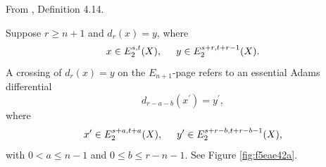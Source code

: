 \begin{definition}
\label{paper:4.14}
From \cite{LWX126}, Definition 4.14.\par
\label{def:classicalcrossdiff}
    Suppose $r\ge n+1$ and $d_r(x)=y$, where
    $$x\in E_2^{s,t}(X), \hspace{0.5cm} y\in E_2^{s+r,t+r-1}(X).$$
    A crossing of $d_r(x)=y$ on the $E_{n+1}$-page refers to an essential Adams differential
    $$d_{r-a-b}(x^\prime)=y^\prime,$$
    where
    $$x^\prime\in E_2^{s+a,t+a}(X), \hspace{.5cm} y^\prime\in E_2^{s+r-b,t+r-b-1}(X),$$
    with $0<a\le n-1$ and $0\le b\le r-n-1$. See Figure \ref{fig:f5eae42a}.


\end{definition}

